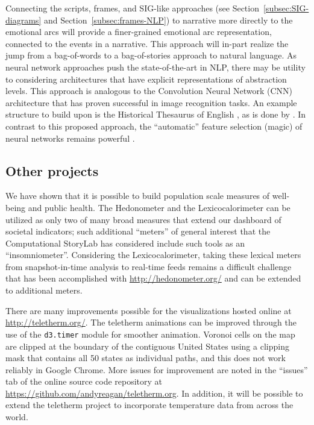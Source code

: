 Connecting the scripts, frames, and SIG-like approaches (see Section~\ref{subsec:SIG-diagrams} and Section~\ref{subsec:frames-NLP}) to narrative more directly to the emotional arcs will provide a finer-grained emotional arc representation, connected to the events in a narrative.
This approach will in-part realize the jump from a bag-of-words to a bag-of-stories approach to natural language.
As neural network approaches push the state-of-the-art in NLP, there may be utility to considering architectures that have explicit representations of abstraction levels.
This approach is analogous to the Convolution Neural Network (CNN) architecture that has proven successful in image recognition tasks.
An example structure to build upon is the Historical Thesaurus of English \citep{kay2009historical}, as is done by \cite{alexander2015metaphor}.
In contrast to this proposed approach, the ``automatic'' feature selection (magic) of neural networks remains powerful \citep{1704.01444}.

\subsection{Other projects}

We have shown that it is possible to build population scale measures of well-being and public health.
The Hedonometer and the Lexicocalorimeter can be utilized as only two of many broad measures that extend our dashboard of societal indicators; such additional ``meters'' of general interest that the Computational StoryLab has considered include such tools as an ``insomniometer''.
Considering the Lexicocalorimeter, taking these lexical meters from snapshot-in-time analysis to real-time feeds remains a difficult challenge that has been accomplished with \href{http://hedonometer.org/}{http://hedonometer.org/} and can be extended to additional meters.

There are many improvements possible for the visualizations hosted online at \href{http://teletherm.org/}{http://teletherm.org/}.
The teletherm animations can be improved through the use of the \verb|d3.timer| module for smoother animation.
Voronoi cells on the map are clipped at the boundary of the contiguous United States using a clipping mask that contains all 50 states as individual paths, and this does not work reliably in Google Chrome.
More issues for improvement are noted in the ``issues'' tab of the online source code repository at \href{https://github.com/andyreagan/teletherm.org}{https://github.com/andyreagan/teletherm.org}.
In addition, it will be possible to extend the teletherm project to incorporate temperature data from across the world.


